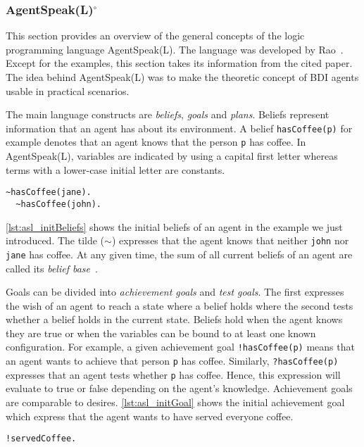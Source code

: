 \subsubsection[AgentSpeak(L)]{AgentSpeak(L)$^\circ$}\label{fun:apl_asl}
This section provides an overview of the general concepts of the logic programming language AgentSpeak(L).
The language was developed by Rao~\cite{rao_agentspeak_1996}.
Except for the examples, this section takes its information from the cited paper.
The idea behind AgentSpeak(L) was to make the theoretic concept of BDI agents usable in practical scenarios. %

The main language constructs are \emph{beliefs}, \emph{goals} and \emph{plans}.
Beliefs represent information that an agent has about its environment.
A belief \texttt{hasCoffee(p)} for example denotes that an agent knows that the person \texttt{p} has coffee.
In AgentSpeak(L), variables are indicated by using a capital first letter whereas terms with a lower-case initial letter are constants. %
\begin{lstlisting}[caption={Initial beliefs.}, label=lst:asl_initBeliefs]
  ~hasCoffee(jane).
  ~hasCoffee(john).
\end{lstlisting}
\autoref{lst:asl_initBeliefs} shows the initial beliefs of an agent in the example we just introduced.
The tilde ($\sim$) expresses that the agent knows that neither \texttt{john} nor \texttt{jane} has coffee.
At any given time, the sum of all current beliefs of an agent are called its \emph{belief base}~\cite{bordini_jason_2005}. %

Goals can be divided into \emph{achievement goals} and \emph{test goals}.
The first expresses the wish of an agent to reach a state where a belief holds where the second tests whether a belief holds in the current state.
Beliefs hold when the agent knows they are true or when the variables can be bound to at least one known configuration.
For example, a given achievement goal \texttt{!hasCoffee(p)} means that an agent wants to achieve that person \texttt{p} has coffee.
Similarly, \texttt{?hasCoffee(p)} expresses that an agent tests whether \texttt{p} has coffee.
Hence, this expression will evaluate to true or false depending on the agent's knowledge.
Achievement goals are comparable to desires. %
\autoref{lst:asl_initGoal} shows the initial achievement goal which express that the agent wants to have served everyone coffee.
\begin{lstlisting}[firstnumber=3, caption={Initial goal.}, label=lst:asl_initGoal]
  !servedCoffee.
\end{lstlisting}

